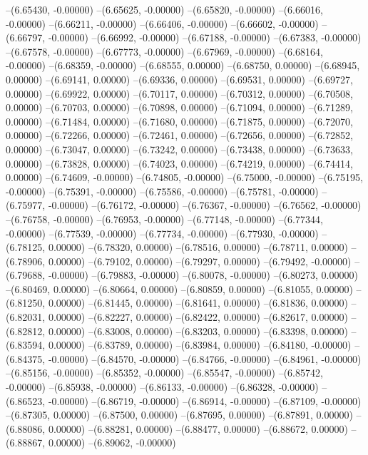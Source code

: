 --(6.65430, -0.00000)
--(6.65625, -0.00000)
--(6.65820, -0.00000)
--(6.66016, -0.00000)
--(6.66211, -0.00000)
--(6.66406, -0.00000)
--(6.66602, -0.00000)
--(6.66797, -0.00000)
--(6.66992, -0.00000)
--(6.67188, -0.00000)
--(6.67383, -0.00000)
--(6.67578, -0.00000)
--(6.67773, -0.00000)
--(6.67969, -0.00000)
--(6.68164, -0.00000)
--(6.68359, -0.00000)
--(6.68555, 0.00000)
--(6.68750, 0.00000)
--(6.68945, 0.00000)
--(6.69141, 0.00000)
--(6.69336, 0.00000)
--(6.69531, 0.00000)
--(6.69727, 0.00000)
--(6.69922, 0.00000)
--(6.70117, 0.00000)
--(6.70312, 0.00000)
--(6.70508, 0.00000)
--(6.70703, 0.00000)
--(6.70898, 0.00000)
--(6.71094, 0.00000)
--(6.71289, 0.00000)
--(6.71484, 0.00000)
--(6.71680, 0.00000)
--(6.71875, 0.00000)
--(6.72070, 0.00000)
--(6.72266, 0.00000)
--(6.72461, 0.00000)
--(6.72656, 0.00000)
--(6.72852, 0.00000)
--(6.73047, 0.00000)
--(6.73242, 0.00000)
--(6.73438, 0.00000)
--(6.73633, 0.00000)
--(6.73828, 0.00000)
--(6.74023, 0.00000)
--(6.74219, 0.00000)
--(6.74414, 0.00000)
--(6.74609, -0.00000)
--(6.74805, -0.00000)
--(6.75000, -0.00000)
--(6.75195, -0.00000)
--(6.75391, -0.00000)
--(6.75586, -0.00000)
--(6.75781, -0.00000)
--(6.75977, -0.00000)
--(6.76172, -0.00000)
--(6.76367, -0.00000)
--(6.76562, -0.00000)
--(6.76758, -0.00000)
--(6.76953, -0.00000)
--(6.77148, -0.00000)
--(6.77344, -0.00000)
--(6.77539, -0.00000)
--(6.77734, -0.00000)
--(6.77930, -0.00000)
--(6.78125, 0.00000)
--(6.78320, 0.00000)
--(6.78516, 0.00000)
--(6.78711, 0.00000)
--(6.78906, 0.00000)
--(6.79102, 0.00000)
--(6.79297, 0.00000)
--(6.79492, -0.00000)
--(6.79688, -0.00000)
--(6.79883, -0.00000)
--(6.80078, -0.00000)
--(6.80273, 0.00000)
--(6.80469, 0.00000)
--(6.80664, 0.00000)
--(6.80859, 0.00000)
--(6.81055, 0.00000)
--(6.81250, 0.00000)
--(6.81445, 0.00000)
--(6.81641, 0.00000)
--(6.81836, 0.00000)
--(6.82031, 0.00000)
--(6.82227, 0.00000)
--(6.82422, 0.00000)
--(6.82617, 0.00000)
--(6.82812, 0.00000)
--(6.83008, 0.00000)
--(6.83203, 0.00000)
--(6.83398, 0.00000)
--(6.83594, 0.00000)
--(6.83789, 0.00000)
--(6.83984, 0.00000)
--(6.84180, -0.00000)
--(6.84375, -0.00000)
--(6.84570, -0.00000)
--(6.84766, -0.00000)
--(6.84961, -0.00000)
--(6.85156, -0.00000)
--(6.85352, -0.00000)
--(6.85547, -0.00000)
--(6.85742, -0.00000)
--(6.85938, -0.00000)
--(6.86133, -0.00000)
--(6.86328, -0.00000)
--(6.86523, -0.00000)
--(6.86719, -0.00000)
--(6.86914, -0.00000)
--(6.87109, -0.00000)
--(6.87305, 0.00000)
--(6.87500, 0.00000)
--(6.87695, 0.00000)
--(6.87891, 0.00000)
--(6.88086, 0.00000)
--(6.88281, 0.00000)
--(6.88477, 0.00000)
--(6.88672, 0.00000)
--(6.88867, 0.00000)
--(6.89062, -0.00000)

